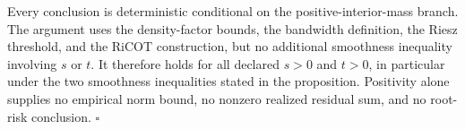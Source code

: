Every conclusion is deterministic conditional on the positive-interior-mass branch. The argument uses the density-factor bounds, the bandwidth definition, the Riesz threshold, and the RiCOT construction, but no additional smoothness inequality involving \(s\) or \(t\). It therefore holds for all declared \(s>0\) and \(t>0\), in particular under the two smoothness inequalities stated in the proposition. Positivity alone supplies no empirical norm bound, no nonzero realized residual sum, and no root-risk conclusion. \(\square\)